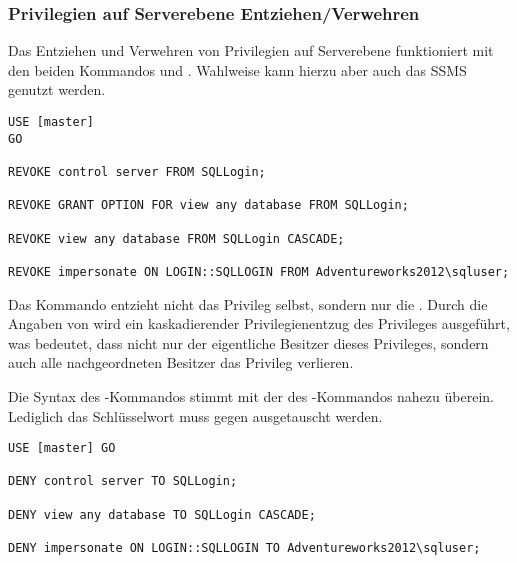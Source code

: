         \subsubsection{Privilegien auf Serverebene Entziehen/Verwehren}
          Das Entziehen und Verwehren von Privilegien auf Serverebene
          funktioniert mit den beiden Kommandos  und
          . Wahlweise kann hierzu aber auch das SSMS genutzt
          werden.
          \begin{lstlisting}[language=ms_sql, caption={Privilegien von einem Server- oder Login-Objekt entziehen}, label=admin19_06]
USE [master]
GO

REVOKE control server FROM SQLLogin;

REVOKE GRANT OPTION FOR view any database FROM SQLLogin;

REVOKE view any database FROM SQLLogin CASCADE;

REVOKE impersonate ON LOGIN::SQLLOGIN FROM Adventureworks2012\sqluser;
          \end{lstlisting}
          Das Kommando  entzieht nicht das
          Privileg selbst, sondern nur die . Durch die
          Angaben von  wird ein kaskadierender
          Privilegienentzug des  Privileges
          ausgeführt, was bedeutet, dass nicht nur der eigentliche Besitzer dieses
          Privileges, sondern auch alle nachgeordneten Besitzer das
           Privileg verlieren.
          
          Die Syntax des -Kommandos stimmt mit der des
          -Kommandos nahezu überein. Lediglich das
          Schlüsselwort 
          muss gegen 
          ausgetauscht werden.
\clearpage
          \begin{lstlisting}[language=ms_sql,caption={Privilegien von einem Server- oder Login-Objekt entziehen}, label=admin19_07]
USE [master] GO

DENY control server TO SQLLogin;

DENY view any database TO SQLLogin CASCADE;

DENY impersonate ON LOGIN::SQLLOGIN TO Adventureworks2012\sqluser;
          \end{lstlisting}

